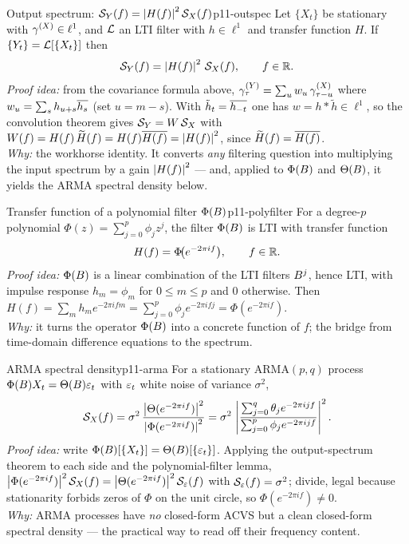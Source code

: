 \begin{theorem}{Output spectrum: $\mathcal{S}_Y(f)=\left\lvert H(f) \right\rvert^2\mathcal{S}_X(f)$}{p11-outspec}
Let $\{X_t\}$ be stationary with $\gamma^{(X)}\in\ell^1$, and $\mathcal{L}$ an LTI
filter with $h\in\ell^1$ and transfer function $H$. If
$\{Y_t\}=\mathcal{L}[\{X_t\}]$ then
\[
\mathcal{S}_Y(f)=\left\lvert H(f) \right\rvert^2\,\mathcal{S}_X(f),\qquad f\in\mathbb{R} .
\]
\textit{Proof idea:} from the covariance formula above,
$\gamma^{(Y)}_\tau=\sum_u w_u\,\gamma^{(X)}_{\tau-u}$ where
$w_u=\sum_s h_{u+s}\overline{h_s}$ (set $u=m-s$). With $\tilde h_t=\overline{h_{-t}}$ one
has $w=h*\tilde h\in\ell^1$, so the convolution theorem gives
$\mathcal{S}_Y=W\,\mathcal{S}_X$ with
$W(f)=H(f)\,\widetilde H(f)=H(f)\overline{H(f)}=\left\lvert H(f) \right\rvert^2$, since
$\widetilde H(f)=\overline{H(f)}$.\\
\textit{Why:} the workhorse identity. It converts \emph{any} filtering question
into multiplying the input spectrum by a gain $\left\lvert H(f) \right\rvert^2$ --- and, applied to
$\Phi(B)$ and $\Theta(B)$, it yields the ARMA spectral density below.
\end{theorem}

\begin{lemma}{Transfer function of a polynomial filter $\Phi(B)$}{p11-polyfilter}
For a degree-$p$ polynomial $\Phi(z)=\sum_{j=0}^p\phi_j z^j$, the filter
$\Phi(B)$ is LTI with transfer function
\[
H(f)=\Phi\!\big(e^{-2\pi i f}\big),\qquad f\in\mathbb{R} .
\]
\textit{Proof idea:} $\Phi(B)$ is a linear combination of the LTI filters
$B^j$, hence LTI, with impulse response $h_m=\phi_m$ for $0\le m\le p$ and $0$
otherwise. Then $H(f)=\sum_m h_m e^{-2\pi i f m}
=\sum_{j=0}^p\phi_j e^{-2\pi i f j}=\Phi(e^{-2\pi i f})$.\\
\textit{Why:} it turns the operator $\Phi(B)$ into a concrete function of
$f$; the bridge from time-domain difference equations to the spectrum.
\end{lemma}

\begin{theorem}{ARMA spectral density}{p11-arma}
For a stationary $\mathrm{ARMA}(p,q)$ process $\Phi(B)X_t=\Theta(B)\varepsilon_t$
with $\varepsilon_t$ white noise of variance $\sigma^2$,
\[
\mathcal{S}_X(f)=\sigma^2\,\frac{\left\lvert \Theta(e^{-2\pi i f}) \right\rvert^2}{\left\lvert \Phi(e^{-2\pi i f}) \right\rvert^2}
=\sigma^2\,\left|\frac{\sum_{j=0}^q\theta_j e^{-2\pi i j f}}
{\sum_{j=0}^p\phi_j e^{-2\pi i j f}}\right|^2 .
\]
\textit{Proof idea:} write $\Phi(B)[\{X_t\}]=\Theta(B)[\{\varepsilon_t\}]$.
Applying the output-spectrum theorem to each side and the polynomial-filter
lemma,
$\left\lvert \Phi(e^{-2\pi i f}) \right\rvert^2\mathcal{S}_X(f)=\left\lvert \Theta(e^{-2\pi i f}) \right\rvert^2\mathcal{S}_\varepsilon(f)$
with $\mathcal{S}_\varepsilon(f)=\sigma^2$; divide, legal because stationarity forbids zeros
of $\Phi$ on the unit circle, so $\Phi(e^{-2\pi i f})\ne0$.\\
\textit{Why:} ARMA processes have \emph{no} closed-form ACVS but a clean
closed-form spectral density --- the practical way to read off their
frequency content.
\end{theorem}

